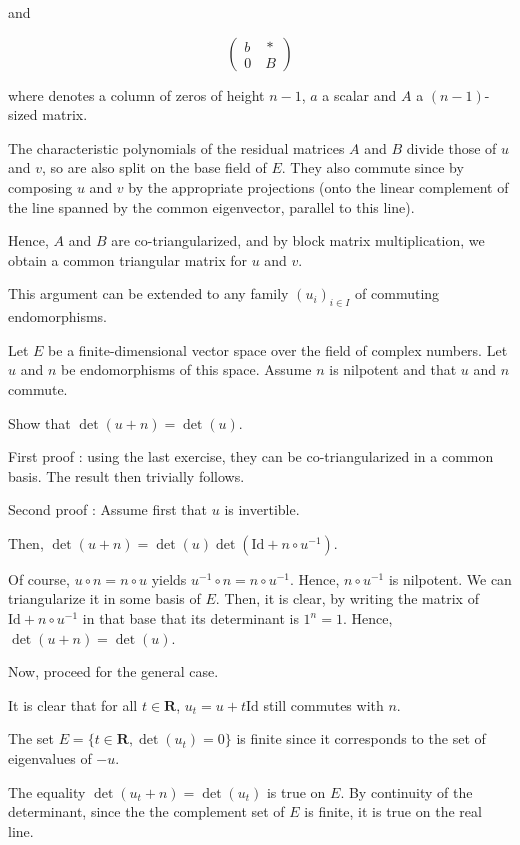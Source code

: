 \begin{solution}
    and 

    \[
        \left(
            \begin{array}{cc}
                b \quad * \\
                0 \quad B
            \end{array}
        \right)
    \]

    where  \fg denotes a column of zeros of height $ n - 1 $, $ a $ a scalar and $ A $ a $ (n-1) $-sized matrix.

    The characteristic polynomials of the residual matrices $ A $ and $ B $ divide those of $ u $ and $ v $, so are also split on the base field of $ E $. They also commute since by composing $ u $ and $ v $ by the appropriate projections (onto the linear complement of the line spanned by the common eigenvector, parallel to this line).

    Hence, $ A $ and $ B $ are co-triangularized, and by block matrix multiplication, we obtain a common triangular matrix for $ u $ and $ v $.
\end{solution}

\begin{remark}
    This argument can be extended to any family $ (u_i)_{i \in I} $ of commuting endomorphisms.
\end{remark}

\begin{exercise}
    Let $ E $ be a finite-dimensional vector space over the field of complex numbers. Let $ u $ and $ n $ be endomorphisms of this space. Assume $ n $ is nilpotent and that $ u $ and $ n $ commute.
    
    Show that $ \det(u+n) = \det(u) $.
\end{exercise}

\begin{solution}
    First proof : using the last exercise, they can be co-triangularized in a common basis. The result then trivially follows.

    Second proof :
    Assume first that $ u $ is invertible.

    Then, $ \det(u+n) = \det(u)\det(\mathrm{Id} + n \circ u^{-1}) $.

    Of course, $ u \circ n = n \circ u $ yields $ u^{-1} \circ n = n \circ u^{-1} $. Hence, $ n \circ u^{-1} $ is nilpotent. We can triangularize it in some basis of $ E $. Then, it is clear, by writing the matrix of $ \mathrm{Id} + n \circ u^{-1} $ in that base that its determinant is $ 1^n = 1 $. Hence, $ \det(u+n) = \det(u) $.

    Now, proceed for the general case.

    It is clear that for all $ t \in \mathbf R $, $ u_t = u + t\mathrm{Id} $ still commutes with $ n $.

    The set $ E = \{ t \in \mathbf R, \det(u_t) = 0 \} $ is finite since it corresponds to the set of eigenvalues of $ -u $.

    The equality $ \det(u_t+n) = \det(u_t) $ is true on $ E $. By continuity of the determinant, since the the complement set of $ E $ is finite, it is true on the real line.
\end{solution}